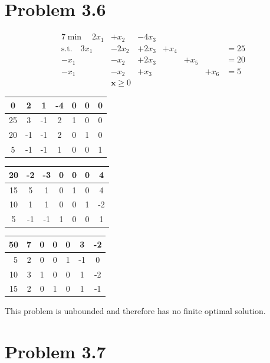 \documentclass[a4paper,12pt]{article}
\begin{document}
\section*{Problem 3.6}
  \begin{alignat*}{7}
    \min \quad 2x_1& + x_2& - 4x_3& {}& {}& {}& \\
    \text{s.t.} \quad 3x_1& - 2x_2& + 2x_3& + x_4& {}& {}& = 25 \\
    -x_1& - x_2&  + 2x_3& {}& + x_5& {}& = 20 \\
    -x_1& - x_2& + x_3& {}& {}& + x_6& = 5 \\
    {}& \mathbf{x} \ge 0
  \end {alignat*}
  \begin{center}
    \begin{tabular}{| c | c  c  c  c  c  c |}
      \hline
      0 & 2 & 1 & -4 & 0 & 0 & 0 \\
      \hline
      25 & 3 & -1 & 2 & 1 & 0 & 0 \\
      20 & -1 & -1 & 2 & 0 & 1 & 0 \\
      5 & -1 & -1 & 1 & 0 & 0 & 1 \\
      \hline
    \end{tabular}
  \end{center}
  \begin{center}
    \begin{tabular}{| c | c  c  c  c  c  c |}
      \hline
      20 & -2 & -3 & 0 & 0 & 0 & 4 \\
      \hline
      15 & 5 & 1 & 0 & 1 & 0 & 4 \\
      10 & 1 & 1 & 0 & 0 & 1 & -2 \\
      5 & -1 & -1 & 1 & 0 & 0 & 1 \\
      \hline
    \end{tabular}
  \end{center}
  \begin{center}
    \begin{tabular}{| c | c  c  c  c  c  c |}
      \hline
      50 & 7 & 0 & 0 & 0 & 3 & -2 \\
      \hline\
      5 & 2 & 0 & 0 & 1 & -1 & 0 \\
      10 & 3 & 1 & 0 & 0 & 1 & -2 \\
      15 & 2 & 0 & 1 & 0 & 1 & -1 \\
      \hline
    \end{tabular}
  \end{center}
 This problem is unbounded and therefore has no finite optimal solution.
\section*{Problem 3.7}
\end{document}
